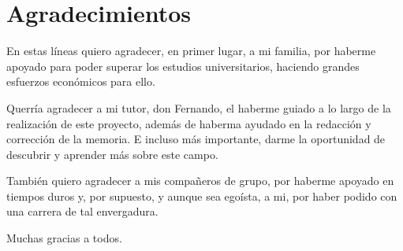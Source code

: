 

\chapter{Agradecimientos}


En estas líneas quiero agradecer, en primer lugar, a mi familia, por haberme apoyado para poder superar los estudios universitarios, haciendo grandes esfuerzos económicos para ello.

Querría agradecer a mi tutor, don Fernando, el haberme guiado a lo largo de la realización de este proyecto, además de haberma ayudado en la redacción y corrección de la memoria. E incluso más importante, darme la oportunidad de descubrir y aprender más sobre este campo.

También quiero agradecer a mis compañeros de grupo, por haberme apoyado en tiempos duros y, por supuesto, y aunque sea egoísta, a mi, por haber podido con una carrera de tal envergadura.

Muchas gracias a todos.

\cleardoublepage
\endinput

